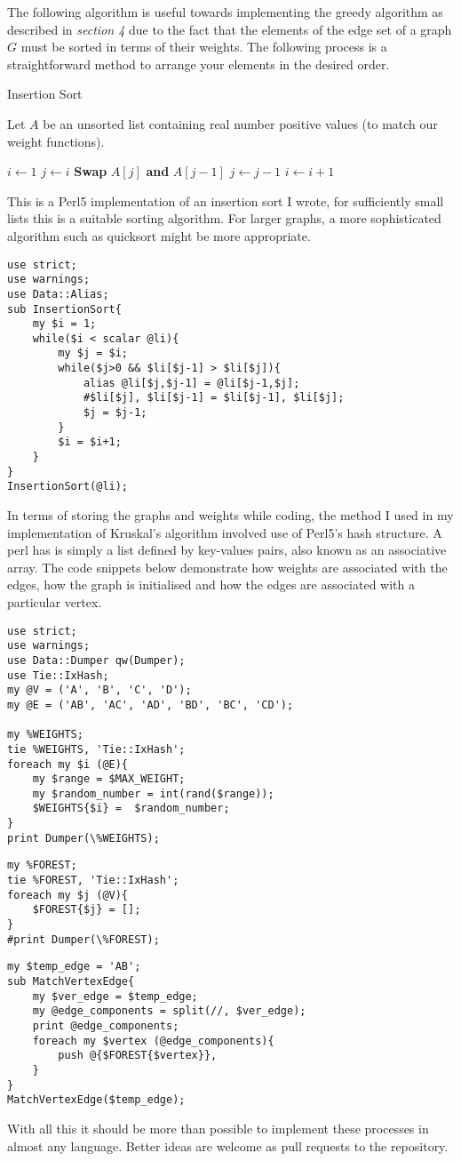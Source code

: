 \documentclass[../main.tex]{subfiles}
\begin{document}
The following algorithm is useful towards implementing the greedy algorithm as described in \textit{section 4} due to the fact that the elements of the edge set of a graph $G$ must be sorted in terms of their weights. The following process is a straightforward method to arrange your elements in the desired order.

\begin{algorithm}[H]
\caption{Insertion Sort}\label{sorting}
Let $A$ be an unsorted list containing real number positive values (to match our weight functions).
\begin{algorithmic}[1]
\State $i \gets 1$
\State $j \gets i$
	\State  \textbf{Swap} $A[j]$ \textbf{and} $A[j-1]$
	\State $j \gets j-1$	
	\EndWhile
	\State $i \gets i+1$
\EndWhile
\EndProcedure
\end{algorithmic}
\end{algorithm}
This is a Perl5 implementation of an insertion sort I wrote, for sufficiently small lists this is a suitable sorting algorithm. For larger graphs, a more sophisticated algorithm such as quicksort might be more appropriate.
\begin{lstlisting}
use strict;
use warnings;
use Data::Alias;
sub InsertionSort{
	my $i = 1;
	while($i < scalar @li){
		my $j = $i;
		while($j>0 && $li[$j-1] > $li[$j]){
			alias @li[$j,$j-1] = @li[$j-1,$j];
			#$li[$j], $li[$j-1] = $li[$j-1], $li[$j];
			$j = $j-1;
		}
		$i = $i+1;
	}
}
InsertionSort(@li);
\end{lstlisting}

In terms of storing the graphs and weights while coding, the method I used in my implementation of Kruskal's algorithm involved use of Perl5's hash structure. A perl has is simply a list defined by key-values pairs, also known as an associative array. The code snippets below demonstrate how weights are associated with the edges, how the graph is initialised and how the edges are associated with a particular vertex.
\begin{lstlisting}
use strict;
use warnings;
use Data::Dumper qw(Dumper);
use Tie::IxHash;
my @V = ('A', 'B', 'C', 'D');
my @E = ('AB', 'AC', 'AD', 'BD', 'BC', 'CD');

my %WEIGHTS;
tie %WEIGHTS, 'Tie::IxHash';
foreach my $i (@E){
  	my $range = $MAX_WEIGHT;
  	my $random_number = int(rand($range));
	$WEIGHTS{$i} =  $random_number;
}
print Dumper(\%WEIGHTS);
\end{lstlisting}
\begin{lstlisting}
my %FOREST;
tie %FOREST, 'Tie::IxHash';
foreach my $j (@V){
	$FOREST{$j} = [];
}
#print Dumper(\%FOREST);
\end{lstlisting}
\begin{lstlisting}
my $temp_edge = 'AB';
sub MatchVertexEdge{
	my $ver_edge = $temp_edge;
	my @edge_components = split(//, $ver_edge);
	print @edge_components;
	foreach my $vertex (@edge_components){
		push @{$FOREST{$vertex}}, 
	}
}
MatchVertexEdge($temp_edge);
\end{lstlisting}

With all this it should be more than possible to implement these processes in almost any language. Better ideas are welcome as pull requests to the repository\cite{github}.
\end{document}
